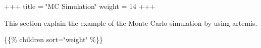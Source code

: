 +++ title = \char`\"{}\+MC Simulation\char`\"{} weight = 14 +++

This section explain the example of the Monte Carlo simulation by using artemis.

\{\{\% children sort=\char`\"{}weight\char`\"{} \%\}\} 